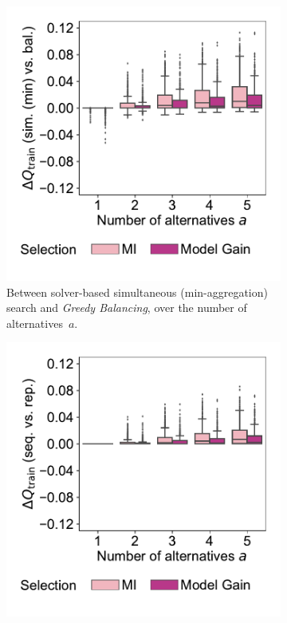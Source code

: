 \documentclass{article}
\theoremstyle{definition}
\begin{document}
\begin{figure}[p]
	\centering
	\begin{subfigure}[t]{0.48\textwidth}
		\centering
		\includegraphics[width=\textwidth, trim=15 30 15 15, clip]{plots/afs-impact-search-heuristics-metric-diff-sim-num-alternatives.pdf}
		\caption{Between solver-based simultaneous (min-aggregation) search and \emph{Greedy Balancing}, over the number of alternatives~$a$.}
		\label{fig:afs:impact-search-heuristics-metric-diff-sim-num-alternatives}
	\end{subfigure}
	\hfill
	\begin{subfigure}[t]{0.48\textwidth}
		\centering
		\includegraphics[width=\textwidth, trim=15 30 15 15, clip]{plots/afs-impact-search-heuristics-metric-diff-seq-num-alternatives.pdf}

\end{subfigure}
\end{figure}
\end{document}
